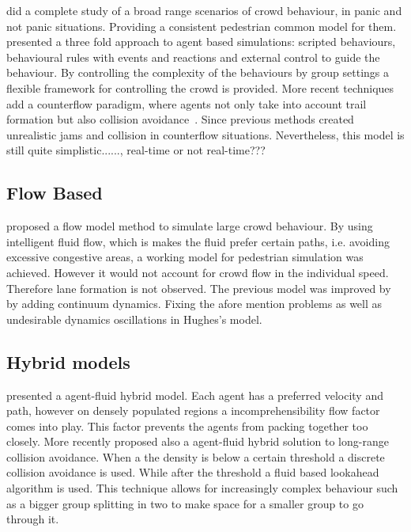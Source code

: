 \documentclass[11pt]{article}
\begin{document}
\begin{multicols}{2}
\cite{helbing2002} did a complete study of a broad range scenarios of crowd behaviour, in panic and not panic situations.
Providing a consistent  pedestrian common model for them.
\cite{raupp2001} presented a three fold approach to agent based simulations: scripted behaviours, behavioural rules with events and reactions and external control to guide the behaviour.
By controlling the complexity of the behaviours by group settings a flexible framework for controlling the crowd is provided.
More recent techniques add a counterflow paradigm, where agents not only take into account trail formation but also collision avoidance~\cite{heliovaara2012}.
Since previous methods created unrealistic jams and collision in counterflow situations.
Nevertheless, this model is still quite simplistic......, real-time or not real-time???

\subsection{Flow Based}

\cite{hughes2003} proposed a flow model method to simulate large crowd behaviour.
By using intelligent fluid flow, which is makes the fluid prefer certain paths, i.e. avoiding excessive congestive areas, a working model for pedestrian simulation was achieved.
However it would not account for crowd flow in the individual speed.
Therefore lane formation is not observed. 
The previous model was improved by \cite{treuille2006} by adding continuum dynamics.
Fixing the afore mention problems as well as undesirable dynamics oscillations in Hughes's model. 

\subsection{Hybrid models}

\cite{Narain2009} presented a agent-fluid hybrid model.
Each agent has a preferred velocity and path, however on densely populated regions a incomprehensibility flow factor comes into play.
This factor prevents the agents from packing together too closely.
More recently \cite{lin2014} proposed also a  agent-fluid hybrid solution to long-range collision avoidance.
When a the density is below a certain threshold a discrete collision avoidance is used.
While after the threshold a fluid based lookahead algorithm is used.
This technique allows for increasingly complex behaviour such as a bigger group splitting in two to make space for a smaller group to go through it.


\end{multicols}
\end{document}
